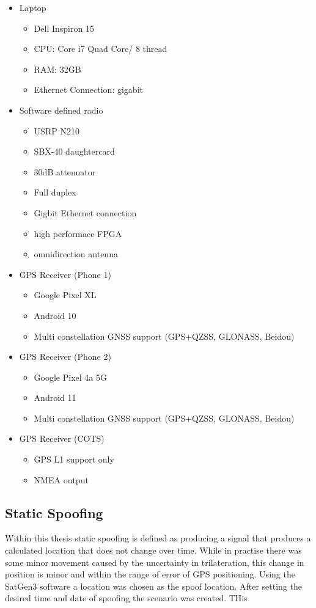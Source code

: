 \begin{itemize}
    \item Laptop
    \begin{itemize}
        \item Dell Inspiron 15
        \item CPU: Core i7 Quad Core/ 8 thread
        \item RAM: 32GB
        \item Ethernet Connection: gigabit
    \end{itemize}
    \item Software defined radio
    \begin{itemize}
        \item USRP N210
        \item SBX-40 daughtercard
        \item 30dB attenuator
        \item Full duplex
        \item Gigbit Ethernet connection
        \item high performace FPGA
        \item omnidirection antenna
    \end{itemize}
    \item GPS Receiver (Phone 1)
    \begin{itemize}
        \item Google Pixel XL
        \item Android 10
        \item Multi constellation GNSS support (GPS+QZSS, GLONASS, Beidou)
    \end{itemize}
    \item GPS Receiver (Phone 2)
    \begin{itemize}
        \item Google Pixel 4a 5G
        \item Android 11
        \item Multi constellation GNSS support (GPS+QZSS, GLONASS, Beidou)
    \end{itemize}
    \item GPS Receiver (COTS)
    \begin{itemize}
        \item GPS L1 support only
        \item NMEA output
    \end{itemize}
\end{itemize}

\subsection{Static Spoofing}
Within this thesis static spoofing is defined as producing a signal that produces a calculated location that does not change over time. While in practise there was some
minor movement caused by the uncertainty in trilateration, this change in position is minor and within the range of error of GPS positioning.
Using the SatGen3 software a location was chosen as the spoof location. After setting the desired time and date of spoofing the scenario was created. THis 

